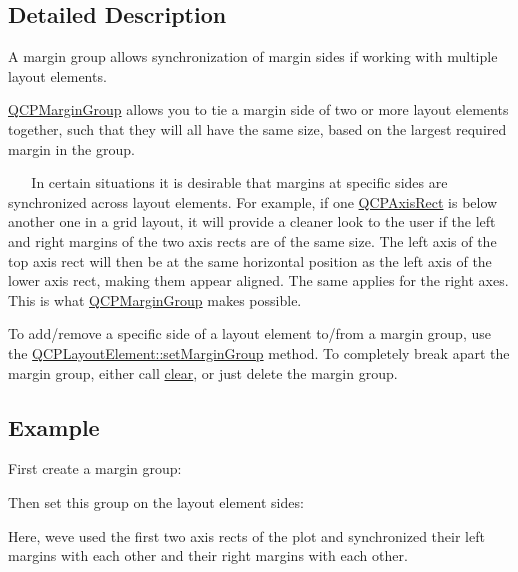 \subsection{Detailed Description}
A margin group allows synchronization of margin sides if working with multiple layout elements. 

\mbox{\hyperlink{class_q_c_p_margin_group}{Q\+C\+P\+Margin\+Group}} allows you to tie a margin side of two or more layout elements together, such that they will all have the same size, based on the largest required margin in the group.

~\newline
~\newline
 In certain situations it is desirable that margins at specific sides are synchronized across layout elements. For example, if one \mbox{\hyperlink{class_q_c_p_axis_rect}{Q\+C\+P\+Axis\+Rect}} is below another one in a grid layout, it will provide a cleaner look to the user if the left and right margins of the two axis rects are of the same size. The left axis of the top axis rect will then be at the same horizontal position as the left axis of the lower axis rect, making them appear aligned. The same applies for the right axes. This is what \mbox{\hyperlink{class_q_c_p_margin_group}{Q\+C\+P\+Margin\+Group}} makes possible.

To add/remove a specific side of a layout element to/from a margin group, use the \mbox{\hyperlink{class_q_c_p_layout_element_a516e56f76b6bc100e8e71d329866847d}{Q\+C\+P\+Layout\+Element\+::set\+Margin\+Group}} method. To completely break apart the margin group, either call \mbox{\hyperlink{class_q_c_p_margin_group_a144b67f216e4e86c3a3a309e850285fe}{clear}}, or just delete the margin group.\hypertarget{class_q_c_p_margin_group_QCPMarginGroup-example}{}\subsection{Example}\label{class_q_c_p_margin_group_QCPMarginGroup-example}
First create a margin group\+: 
\begin{DoxyCodeInclude}
\end{DoxyCodeInclude}
Then set this group on the layout element sides\+: 
\begin{DoxyCodeInclude}
\end{DoxyCodeInclude}
Here, we\textquotesingle{}ve used the first two axis rects of the plot and synchronized their left margins with each other and their right margins with each other. 

